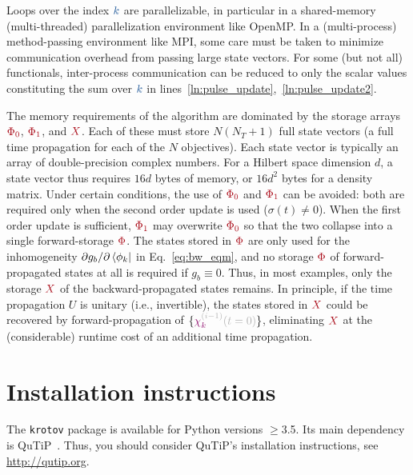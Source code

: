 \documentclass[submission, Phys]{SciPost}
\newcommand{\VarScalar}[1]{{\color{clVarScalar}#1}}
\newcommand{\VarState}[1]{\ensuremath{\textcolor{clVarState}{#1}}}
\newcommand{\PropAnnotation}[1]{\textcolor{black!30}{#1}}
\newcommand{\VarPropState}[4]{\ensuremath{\VarState{#1}_{\textcolor{clVarState}{#2}}^{\PropAnnotation{#3}}\PropAnnotation{(#4)}}}  %
\newcommand{\VarArray}[1]{{\color{clVarArray}#1}}
\begin{document}
Loops over the index $\VarScalar{k}$ are parallelizable, in particular in a
shared-memory (multi-threaded) parallelization environment like OpenMP. In a
(multi-process) method-passing environment like MPI, some care must be taken to
minimize communication overhead from passing large state vectors.
For some (but not all) functionals, inter-process communication can be reduced
to only the scalar values constituting the sum over $\VarScalar{k}$ in
lines~\ref{ln:pulse_update},~\ref{ln:pulse_update2}.

The memory requirements of the algorithm are dominated by the storage arrays
$\VarArray{\Phi_0}$, $\VarArray{\Phi_1}$, and $\VarArray{X}$.
Each of these must store $N (N_T + 1)$ full state vectors (a full time
propagation for each of the $N$ objectives). Each state vector is typically an
array of double-precision complex numbers.
For a Hilbert space dimension $d$, a state vector thus requires $16 d$ bytes of
memory, or $16 d^2$ bytes for a density matrix.
Under certain conditions, the use of $\VarArray{\Phi_0}$ and $\VarArray{\Phi_1}$
can be avoided: both are required only when the second order update is used
($\sigma(t) \neq 0$). When the first order update is sufficient,
$\VarArray{\Phi_1}$ may overwrite $\VarArray{\Phi_0}$ so that the two collapse
into a single forward-storage $\VarArray{\Phi}$.
The states stored in $\VarArray{\Phi}$ are only used for the inhomogeneity
$\partial g_b / \partial \bra{\phi_k}$ in Eq.~\eqref{eq:bw_eqm}, and no storage
$\VarArray{\Phi}$ of forward-propagated states at all is required if $g_b \equiv
0$.
Thus, in most examples, only the storage $\VarArray{X}$ of the
backward-propagated states remains.
In principle, if the time propagation $U$ is unitary (i.e., invertible), the
states stored in $\VarArray{X}$ could be recovered by forward-propagation of
$\{\VarPropState{\chi}{k}{(i-1)}{t=0}\}$, eliminating $\VarArray{X}$ at the
(considerable) runtime cost of an additional time propagation.


\section{Installation instructions}%
\label{apx:installation_instructions}

The \texttt{krotov} package is available for Python versions $\ge$3.5.
Its main dependency is QuTiP~\cite{JohanssonCPC2012, JohanssonCPC2013}.
Thus, you should consider QuTiP's installation instructions, see
\url{http://qutip.org}.
\end{document}
